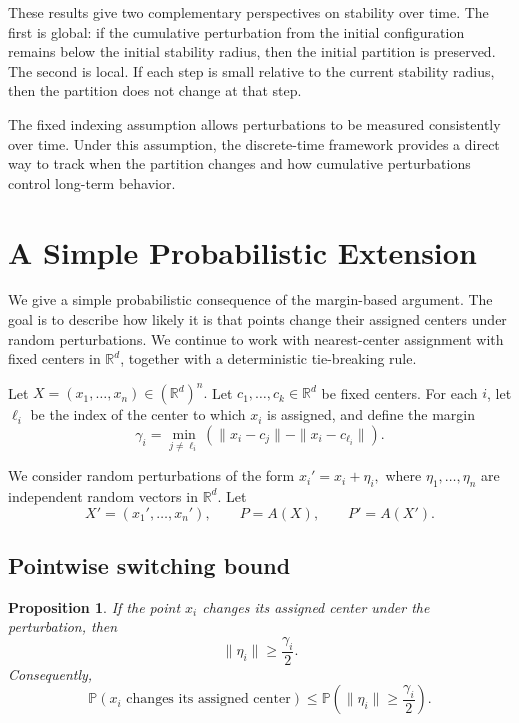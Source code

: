 \documentclass[11pt]{amsart}
\theoremstyle{plain}
\newtheorem{proposition}[subsection]{Proposition}
\theoremstyle{definition}
\begin{document}
These results give two complementary perspectives on stability over time. The first is global: if the cumulative perturbation from the initial configuration remains below the initial stability radius, then the initial partition is preserved. The second is local. If each step is small relative to the current stability radius, then the partition does not change at that step.

The fixed indexing assumption allows perturbations to be measured consistently over time. Under this assumption, the discrete-time framework provides a direct way to track when the partition changes and how cumulative perturbations control long-term behavior.





\section{A Simple Probabilistic Extension}

We give a simple probabilistic consequence of the margin-based argument. The goal is to describe how likely it is that points change their assigned centers under random perturbations. We continue to work with nearest-center assignment with fixed centers in $\mathbb{R}^d$, together with a deterministic tie-breaking rule.

\smallskip

Let
$X = (x_1, \ldots, x_n) \in (\mathbb{R}^d)^n.$ Let $c_1, \ldots, c_k \in \mathbb{R}^d$ be fixed centers. For each $i$, let $\ell_i$ be the index of the center to which $x_i$ is assigned, and define the margin
\[
\gamma_i = \min_{j \ne \ell_i} \left( \|x_i - c_j\| - \|x_i - c_{\ell_i}\| \right).
\]

We consider random perturbations of the form
$x_i' = x_i + \eta_i,$
where $\eta_1, \ldots, \eta_n$ are independent random vectors in $\mathbb{R}^d$. Let
\[
X' = (x_1', \ldots, x_n'), \qquad P = A(X), \qquad P' = A(X').
\]

\subsection{Pointwise switching bound}

\begin{proposition}
If the point $x_i$ changes its assigned center under the perturbation, then
\[
\|\eta_i\| \ge \frac{\gamma_i}{2}.
\]
Consequently,
\[
\mathbb{P}(\text{$x_i$ changes its assigned center}) 
\le \mathbb{P}\!\left( \|\eta_i\| \ge \frac{\gamma_i}{2} \right).
\]
\end{proposition}
\end{document}
